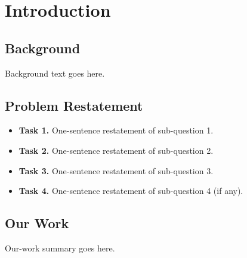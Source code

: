 
\section{Introduction}
\subsection{Background}
Background text goes here.

\subsection{Problem Restatement}
\begin{itemize}
    \setlength{\parsep}{0ex}
    \setlength{\topsep}{2ex}
    \setlength{\itemsep}{1ex}
    \item \textbf{Task 1.} One-sentence restatement of sub-question 1.
    \item \textbf{Task 2.} One-sentence restatement of sub-question 2.
    \item \textbf{Task 3.} One-sentence restatement of sub-question 3.
    \item \textbf{Task 4.} One-sentence restatement of sub-question 4 (if any).
\end{itemize}

\subsection{Our Work}
Our-work summary goes here.


